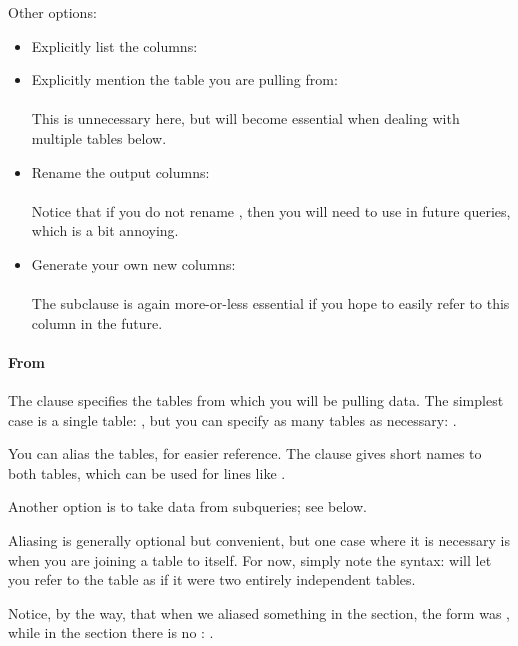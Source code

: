 Other options:\begin{itemize}
\item Explicitly list the columns:\\ 
\item Explicitly mention the table you are pulling from:\\
\\
This is unnecessary here, but will become
essential when dealing with multiple tables below.
\item Rename the output columns:\\
\\ 
Notice that if you do not rename , then you will need to use  in future
queries, which is a
bit annoying.
\item Generate your own new columns:\\
\\
The  subclause is again more-or-less
essential if you hope to easily refer to this column in the future. 
\end{itemize}

\paragraph{From} The  clause specifies the tables from which
you will be pulling data. The simplest case is a single table: , but you can specify as many tables as necessary: . 

You can alias the tables, for easier reference. The clause 
 gives short names to both tables, which can
be used for lines like . 

Another option is to take data from subqueries; see below.

Aliasing is generally optional but convenient, but one case where
it is necessary is when you are joining a table to itself.
For now, simply note the syntax:  will let
you refer to the  table as if it were two entirely independent
tables. 

Notice, by the way, that when we aliased something in the 
section, the form was , while
in the  section there is no : .

